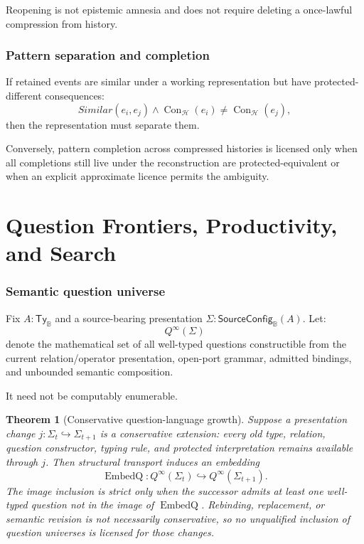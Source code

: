\documentclass[11pt,oneside]{article}
\newtheorem{theorem}[definition]{Theorem}
\newcommand{\B}{\mathbb B}
\newcommand{\Con}{\operatorname{Con}}
\begin{document}
Reopening is not epistemic amnesia and does not require deleting a once-lawful compression from history.

\section{Pattern separation and completion}

If retained events are similar under a working representation but have protected-different consequences:
\[
Similar(e_i,e_j)
\land
\Con_{\mathcal H}(e_i)\neq\Con_{\mathcal H}(e_j),
\]
then the representation must separate them.

Conversely, pattern completion across compressed histories is licensed only when all completions still live under the reconstruction are protected-equivalent or when an explicit approximate licence permits the ambiguity.

\part{Question Frontiers, Productivity, and Search}

\section{Semantic question universe}

Fix \(A:\mathsf{Ty}_{\B}\) and a source-bearing presentation
\(\Sigma:\mathsf{SourceConfig}_{\B}(A)\).  Let:
\[
Q^\infty(\Sigma)
\]
denote the mathematical set of all well-typed questions constructible from the current relation/operator presentation, open-port grammar, admitted bindings, and unbounded semantic composition.

It need not be computably enumerable.

\begin{theorem}[Conservative question-language growth]\label{thm:conservative-question-growth}
Suppose a presentation change \(j:\Sigma_t\hookrightarrow\Sigma_{t+1}\) is a
conservative extension: every old type, relation, question constructor, typing rule,
and protected interpretation remains available through \(j\).  Then structural
transport induces an embedding
\[
\boxed{
\operatorname{EmbedQ}:Q^\infty(\Sigma_t)\hookrightarrow Q^\infty(\Sigma_{t+1}).
}
\]
The image inclusion is strict only when the successor admits at least one well-typed
question not in the image of \(\operatorname{EmbedQ}\).  Rebinding, replacement, or semantic revision
is not necessarily conservative, so no unqualified inclusion of question universes is
licensed for those changes.
\end{theorem}
\end{document}

